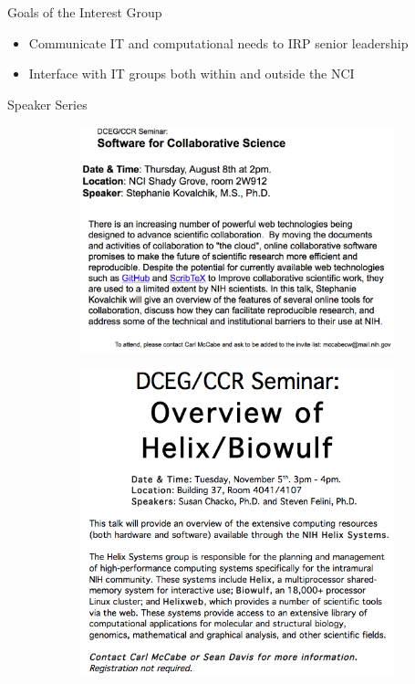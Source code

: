 \documentclass[final]{beamer}
\begin{document}
\begin{frame}[t]
\begin{columns}[t]
\begin{column}{0.3\linewidth}
\begin{block}{Goals of the Interest Group}
\begin{itemize}
        \item{Communicate IT and computational needs to IRP senior leadership}
        \item{Interface with IT groups both within and outside the NCI}
        \end{itemize}
      \end{block}
      \begin{block}{Speaker Series}
        \begin{figure}
          \centering
          \begin{subfigure}{.45\textwidth}
            \centering
            \includegraphics[width=1\linewidth]{collabSoftwareTools}
            \label{fig:sub1}
          \end{subfigure}
          \begin{subfigure}{.45\textwidth}
            \centering
            \includegraphics[width=1\linewidth]{helixOverview}

\end{subfigure}
\end{figure}
\end{block}
\end{column}
\end{columns}
\end{frame}
\end{document}

